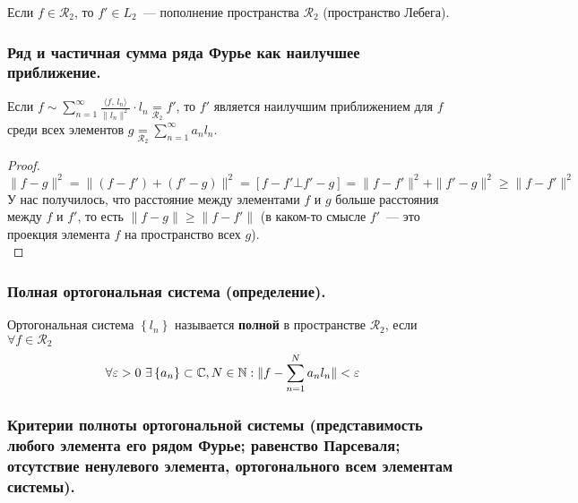 Если $f \in \mathcal{R}_2$, то $f' \in L_2$~--- пополнение пространства $\mathcal{R}_2$ (пространство Лебега).

\subsubsection{Ряд и частичная сумма ряда Фурье как наилучшее приближение. \label{subsubsec:label3}}
\begin{theorem*}
    Если $f \sim \sum_{n=1}^\infty \frac{\langle f,\, l_n \rangle}{\| l_n \|^2} \cdot l_n \underset{\mathcal{R}_2}{=}f'$, то $f'$ является наилучшим приближением для $f$ среди всех элементов $g \underset{\mathcal{R}_2}{=} \sum_{n=1}^\infty a_n l_n$.    
\end{theorem*}
\begin{proof}
    \[\| f - g \|^2 = \| (f - f') + (f' - g) \|^2 = [f - f' \bot f' - g] = \| f - f' \|^2 + \| f' - g \|^2 \geq \| f - f' \|^2 \]
    У нас получилось, что расстояние между элементами $f$ и $g$ больше расстояния между $f$ и $f'$, то есть $\| f - g \| \geq \| f - f' \|$ (в каком-то смысле $f'$~--- это проекция элемента $f$ на пространство всех $g$).\\
\end{proof}

\subsubsection{Полная ортогональная система (определение).}
\begin{definition*}
    Ортогональная система $\left\{ l_n \right\}$ называется \textbf{полной} в пространстве $\mathcal{R}_2$, если $\forall f \in \mathcal{R}_2$
    \[\forall \varepsilon > 0\ \exists \left\{ a_n \right\}\subset \mathbb{C}, N \in \mathbb{N}: \| f - \sum_{n=1}^N a_n l_n \| < \varepsilon\]
\end{definition*}

\subsubsection{Критерии полноты ортогональной системы (представимость любого элемента его рядом Фурье; равенство Парсеваля; отсутствие ненулевого элемента, ортогонального всем элементам системы).}

